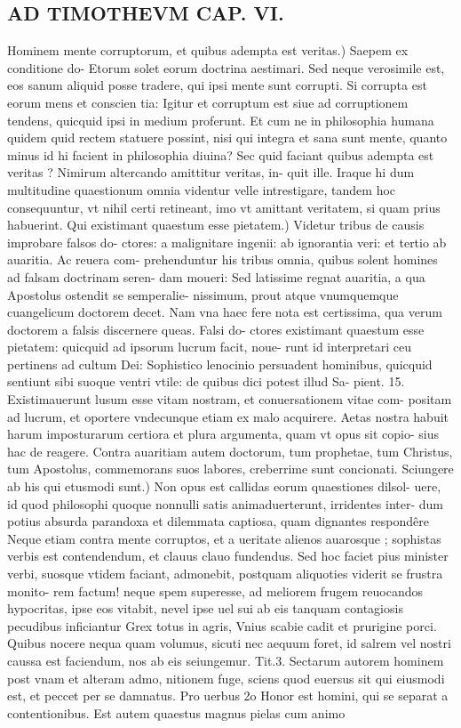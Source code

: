 \documentclass{article}
\begin{document}
\begin{pages}
\section*{AD TIMOTHEVM CAP. VI. }
\marginpar{[ p.123 ]}\pstart Hominem mente corruptorum, et quibus adempta est veritas.) Saepem ex conditione do- Etorum solet eorum doctrina aestimari. Sed neque verosimile est, eos sanum aliquid posse tradere, qui ipsi mente sunt corrupti. Si corrupta est eorum mens et conscien tia: Igitur et corruptum est siue ad corruptionem tendens, quicquid ipsi in medium proferunt. Et cum ne in philosophia humana quidem quid rectem statuere possint, nisi qui integra et sana sunt mente, quanto minus id hi facient in philosophia diuina? Sec quid faciant quibus adempta est veritas ? Nimirum altercando amittitur veritas, in- quit ille. Iraque hi dum multitudine quaestionum omnia videntur velle intrestigare, tandem hoc consequuntur, vt nihil certi retineant, imo vt amittant veritatem, si quam prius habuerint.  \pend\pstart Qui existimant quaestum esse pietatem.) Videtur tribus de causis improbare falsos do- ctores: a malignitare ingenii: ab ignorantia veri: et tertio ab auaritia. Ac reuera com- prehenduntur his tribus omnia, quibus solent homines ad falsam doctrinam seren- dam moueri: Sed latissime regnat auaritia, a qua Apostolus ostendit se semperalie- nissimum, prout atque vnumquemque cuangelicum doctorem decet. Nam vna haec fere nota est certissima, qua verum doctorem a falsis discernere queas. Falsi do- ctores existimant quaestum esse pietatem: quicquid ad ipsorum lucrum facit, noue- runt id interpretari ceu pertinens ad cultum Dei: Sophistico lenocinio persuadent hominibus, quicquid sentiunt sibi suoque ventri vtile: de quibus dici potest illud Sa- pient. 15. Existimauerunt lusum esse vitam nostram, et conuersationem vitae com- positam ad lucrum, et oportere vndecunque etiam ex malo acquirere. Aetas nostra habuit harum imposturarum certiora et plura argumenta, quam vt opus sit copio- sius hac de reagere. Contra auaritiam autem doctorum, tum prophetae, tum Christus, tum Apostolus, commemorans suos labores, creberrime sunt concionati.  \pend\pstart Sciungere ab his qui etusmodi sunt.) Non opus est callidas eorum quaestiones dilsol- uere, id quod philosophi quoque nonnulli satis animaduerterunt, irridentes inter- dum potius absurda parandoxa et dilemmata captiosa, quam dignantes respondêre Neque etiam contra mente corruptos, et a ueritate alienos auarosque ; sophistas verbis est contendendum, et clauus clauo fundendus. Sed hoc faciet pius minister verbi, suosque vtidem faciant, admonebit, postquam aliquoties viderit se frustra monito- rem factum! neque spem superesse, ad meliorem frugem reuocandos hypocritas, ipse eos vitabit, nevel ipse uel sui ab eis tanquam contagiosis pecudibus inficiantur Grex totus in agris, Vnius scabie cadit et prurigine porci. Quibus nocere nequa quam volumus, sicuti nec aequum foret, id salrem vel nostri caussa est faciendum, nos ab eis seiungemur. Tit.3. Sectarum autorem hominem post vnam et alteram admo, nitionem fuge, sciens quod euersus sit qui eiusmodi est, et peccet per se damnatus. Pro uerbus 2o Honor est homini, qui se separat a contentionibus.  \pend\pstart Est autem quaestus magnus pielas cum animo 
\end{pages}
\end{document}
